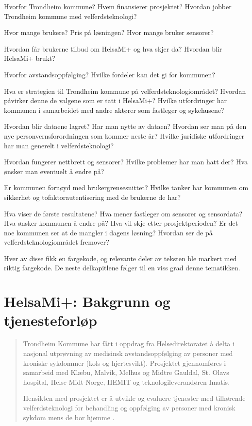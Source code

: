 \begin{description}[leftmargin=!,labelwidth=\widthof{\bfseries Brukeropplevelse og sikkerhet}]
    \item[Bakgrunn for HelsaMi+] Hvorfor Trondheim kommune? Hvem finansierer prosjektet? Hvordan jobber Trondheim kommune med
		velferdsteknologi?
	\item[Om HelsaMi+ per i dag] Hvor mange brukere? Pris på løsningen? Hvor mange bruker sensorer?
	\item[Tjenesteforløp i HelsaMi+] Hvordan får brukerne tilbud om HelsaMi+ og hva skjer da? Hvordan blir HelsaMi+ brukt?
	\item[Motivasjon for HelsaMi+] Hvorfor avstandsoppfølging? Hvilke fordeler kan det gi for kommunen?
	\item[Politikk og samhandling] Hva er strategien til Trondheim kommune på velferdsteknologiområdet? Hvordan påvirker denne
		de valgene som er tatt i HelsaMi+? Hvilke utfordringer har kommunen i samarbeidet med andre aktører som fastleger og sykehusene?
	\item[Juridiske utfordringer] Hvordan blir dataene lagret? Har man nytte av dataen? Hvordan ser man på den nye personvernsforordningen som kommer
		neste år? Hvilke juridiske utfordringer har man generelt i velferdsteknologi?
	\item[Tekniske utfordinger] Hvordan fungerer nettbrett og sensorer? Hvilke problemer har man hatt der? Hva ønsker man eventuelt å endre på?
    \item[Brukeropplevelse og sikkerhet] Er kommunen fornøyd med brukergrensesnittet? Hvilke tanker har kommunen om sikkerhet
        og tofaktorautentisering med de brukerne de har?
    \item[Tilbakemeldinger og planer] Hva viser de første resultatene? Hva mener fastleger om sensorer og sensordata?
        Hva ønsker kommunen å endre på? Hva vil skje etter prosjektperioden? Er det noe kommunen ser at de mangler i dagens løsning?
        Hvordan ser de på velferdsteknologiområdet fremover?
\end{description}

Hver av disse fikk en fargekode, og relevante deler av teksten ble markert med
riktig fargekode. De neste delkapitlene følger til en viss grad denne tematikken.

\section{HelsaMi+: Bakgrunn og tjenesteforløp}
\blockquote{
Trondheim Kommune har fått i oppdrag fra Helsedirektoratet å delta i nasjonal utprøvning av medisinsk avstandsoppfølging av personer med kroniske sykdommer (kols og
hjertesvikt). Prosjektet gjennomføres i samarbeid med Klæbu, Malvik, Melhus og Midtre Gauldal, St. Olavs hospital, Helse Midt-Norge, HEMIT og teknologileverandøren
Imatis.

Hensikten med prosjektet er å utvikle og evaluere tjenester med tilhørende velferdsteknologi for behandling og oppfølging av personer med kronisk sykdom mens de bor
hjemme \citep{trondheim_avstand}.
}

